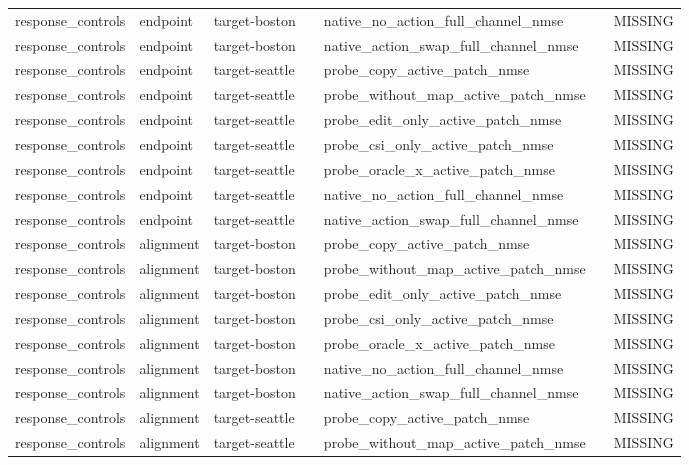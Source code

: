 \begin{longtable}{lllllll}
response\_controls & endpoint & target-boston &  & native\_no\_action\_full\_channel\_nmse &  & MISSING \\
response\_controls & endpoint & target-boston &  & native\_action\_swap\_full\_channel\_nmse &  & MISSING \\
response\_controls & endpoint & target-seattle &  & probe\_copy\_active\_patch\_nmse &  & MISSING \\
response\_controls & endpoint & target-seattle &  & probe\_without\_map\_active\_patch\_nmse &  & MISSING \\
response\_controls & endpoint & target-seattle &  & probe\_edit\_only\_active\_patch\_nmse &  & MISSING \\
response\_controls & endpoint & target-seattle &  & probe\_csi\_only\_active\_patch\_nmse &  & MISSING \\
response\_controls & endpoint & target-seattle &  & probe\_oracle\_x\_active\_patch\_nmse &  & MISSING \\
response\_controls & endpoint & target-seattle &  & native\_no\_action\_full\_channel\_nmse &  & MISSING \\
response\_controls & endpoint & target-seattle &  & native\_action\_swap\_full\_channel\_nmse &  & MISSING \\
response\_controls & alignment & target-boston &  & probe\_copy\_active\_patch\_nmse &  & MISSING \\
response\_controls & alignment & target-boston &  & probe\_without\_map\_active\_patch\_nmse &  & MISSING \\
response\_controls & alignment & target-boston &  & probe\_edit\_only\_active\_patch\_nmse &  & MISSING \\
response\_controls & alignment & target-boston &  & probe\_csi\_only\_active\_patch\_nmse &  & MISSING \\
response\_controls & alignment & target-boston &  & probe\_oracle\_x\_active\_patch\_nmse &  & MISSING \\
response\_controls & alignment & target-boston &  & native\_no\_action\_full\_channel\_nmse &  & MISSING \\
response\_controls & alignment & target-boston &  & native\_action\_swap\_full\_channel\_nmse &  & MISSING \\
response\_controls & alignment & target-seattle &  & probe\_copy\_active\_patch\_nmse &  & MISSING \\
response\_controls & alignment & target-seattle &  & probe\_without\_map\_active\_patch\_nmse &  & MISSING \\

\end{longtable}
